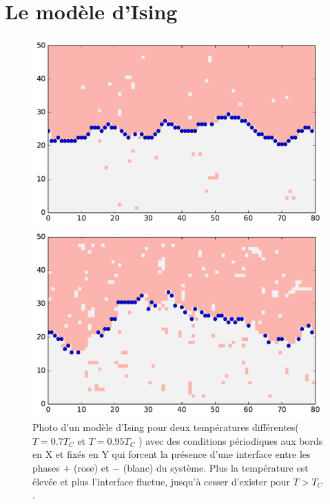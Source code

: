    \section{Le modèle d'Ising}
\begin{figure}
	\begin{minipage}[t]{0.5\linewidth}
		\includegraphics[width=\linewidth]{isingtosos/snap07.pdf}
	\end{minipage}%
	\begin{minipage}[t]{0.5\linewidth}
		\includegraphics[width=\linewidth]{isingtosos/snap09.pdf}
	\end{minipage}
	\caption{Photo d'un modèle d'Ising pour deux températures différentes($T=0.7 T_C$ et $T=0.95 T_C$ ) avec des conditions périodiques aux bords en X et fixés en Y qui forcent la présence d'une interface entre les phases $+$ (rose) et $-$ (blanc) du système. Plus la température est élevée et plus l'interface fluctue, jusqu'à cesser d'exister pour $T \greater T_C$. }
	\label{amas-fixe}
\end{figure}  

